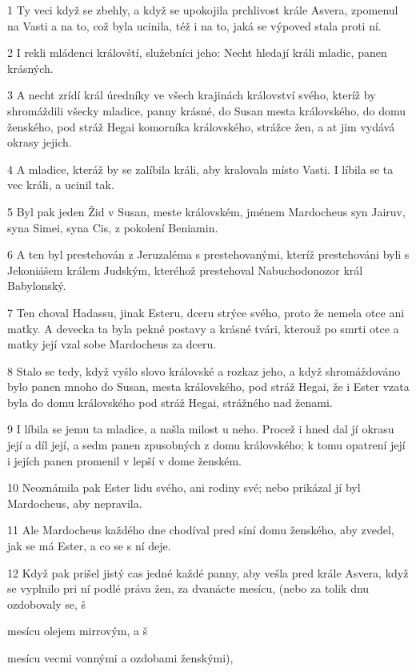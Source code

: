 \par 1 Ty veci když se zbehly, a když se upokojila prchlivost krále Asvera, zpomenul na Vasti a na to, což byla ucinila, též i na to, jaká se výpoved stala proti ní.
\par 2 I rekli mládenci královští, služebníci jeho: Necht hledají králi mladic, panen krásných.
\par 3 A necht zrídí král úredníky ve všech krajinách království svého, kteríž by shromáždili všecky mladice, panny krásné, do Susan mesta královského, do domu ženského, pod stráž Hegai komorníka královského, strážce žen, a at jim vydává okrasy jejich.
\par 4 A mladice, kteráž by se zalíbila králi, aby kralovala místo Vasti. I líbila se ta vec králi, a ucinil tak.
\par 5 Byl pak jeden Žid v Susan, meste královském, jménem Mardocheus syn Jairuv, syna Simei, syna Cis, z pokolení Beniamin.
\par 6 A ten byl prestehován z Jeruzaléma s prestehovanými, kteríž prestehováni byli s Jekoniášem králem Judským, kteréhož prestehoval Nabuchodonozor král Babylonský.
\par 7 Ten choval Hadassu, jinak Esteru, dceru strýce svého, proto že nemela otce ani matky. A devecka ta byla pekné postavy a krásné tvári, kterouž po smrti otce a matky její vzal sobe Mardocheus za dceru.
\par 8 Stalo se tedy, když vyšlo slovo královské a rozkaz jeho, a když shromáždováno bylo panen mnoho do Susan, mesta královského, pod stráž Hegai, že i Ester vzata byla do domu královského pod stráž Hegai, strážného nad ženami.
\par 9 I líbila se jemu ta mladice, a našla milost u neho. Procež i hned dal jí okrasu její a díl její, a sedm panen zpusobných z domu královského; k tomu opatrení její i jejích panen promenil v lepší v dome ženském.
\par 10 Neoznámila pak Ester lidu svého, ani rodiny své; nebo prikázal jí byl Mardocheus, aby nepravila.
\par 11 Ale Mardocheus každého dne chodíval pred síní domu ženského, aby zvedel, jak se má Ester, a co se s ní deje.
\par 12 Když pak prišel jistý cas jedné každé panny, aby vešla pred krále Asvera, když se vyplnilo pri ní podlé práva žen, za dvanácte mesícu, (nebo za tolik dnu ozdobovaly se, š\par mesícu olejem mirrovým, a š\par mesícu vecmi vonnými a ozdobami ženskými),
